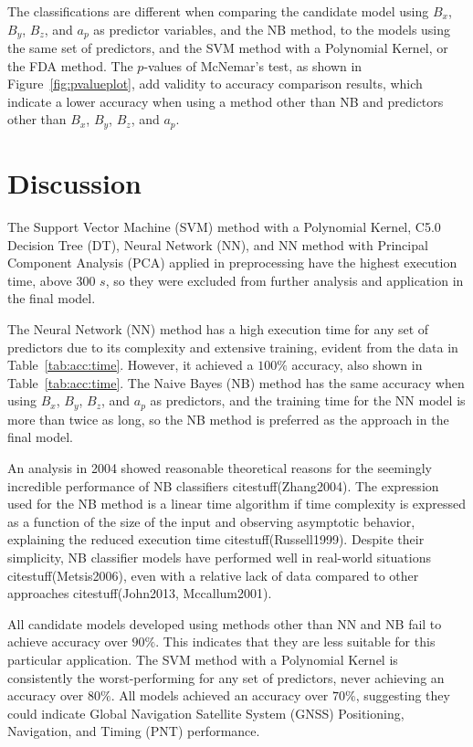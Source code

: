 \let\LaTeXcline\cline\documentclass[sn-mathphys-num]{sn-jnl}\let\cline\LaTeXcline
\begin{document}
The classifications are different when comparing the candidate model using $B_{x}$, $B_{y}$, $B_{z}$, and $a_{p}$ as predictor variables, and the NB method, to the models using the same set of predictors, and the SVM method with a Polynomial Kernel, or the FDA method. The $p$-values of McNemar's test, as shown in Figure~\ref{fig:pvalueplot}, add validity to accuracy comparison results, which indicate a lower accuracy when using a method other than NB and predictors other than $B_{x}$, $B_{y}$, $B_{z}$, and $a_{p}$.

\section{Discussion}
\label{sec:Discussion}

The Support Vector Machine (SVM) method with a Polynomial Kernel, C5.0 Decision Tree (DT), Neural Network (NN), and NN method with Principal Component Analysis (PCA) applied in preprocessing have the highest execution time, above $300$ $s$, so they were excluded from further analysis and application in the final model.

The Neural Network (NN) method has a high execution time for any set of predictors due to its complexity and extensive training, evident from the data in Table~\ref{tab:acc:time}. However, it achieved a $100\%$ accuracy, also shown in Table~\ref{tab:acc:time}. The Naive Bayes (NB) method has the same accuracy when using $B_{x}$, $B_{y}$, $B_{z}$, and $a_{p}$ as predictors, and the training time for the NN model is more than twice as long, so the NB method is preferred as the approach in the final model.

An analysis in 2004 showed reasonable theoretical reasons for the seemingly incredible performance of NB classifiers citestuff(Zhang2004). The expression used for the NB method is a linear time algorithm if time complexity is expressed as a function of the size of the input and observing asymptotic behavior, explaining the reduced execution time citestuff(Russell1999). Despite their simplicity, NB classifier models have performed well in real-world situations citestuff(Metsis2006), even with a relative lack of data compared to other approaches citestuff(John2013, Mccallum2001).

All candidate models developed using methods other than NN and NB fail to achieve accuracy over $90\%$. This indicates that they are less suitable for this particular application. The SVM method with a Polynomial Kernel is consistently the worst-performing for any set of predictors, never achieving an accuracy over $80\%$. All models achieved an accuracy over $70\%$, suggesting they could indicate Global Navigation Satellite System (GNSS) Positioning, Navigation, and Timing (PNT) performance.
\end{document}
